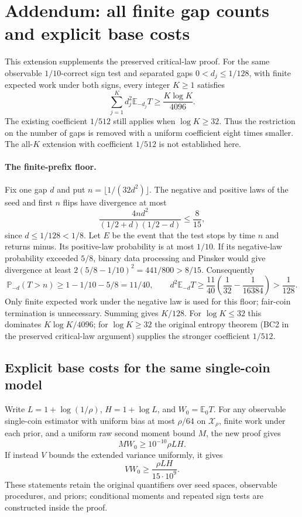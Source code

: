\documentclass[11pt]{article}
\newcommand{\E}{\mathbb E}
\newcommand{\Pp}{\mathbb P}
\begin{document}
\endgroup
\clearpage
\section*{Addendum: all finite gap counts and explicit base costs}
{}

This extension supplements the preserved critical-law proof. For the same
observable $1/10$-correct sign test and separated gaps $0<d_j\le1/128$,
with finite expected work under both signs, every integer $K\ge1$ satisfies
\[
 \sum_{j=1}^K d_j^2\E_{-d_j}T\ge\frac{K\log K}{4096}.
\]
The existing coefficient $1/512$ still applies when $\log K\ge32$.
Thus the restriction on the number of gaps is removed with a uniform
coefficient eight times smaller. The all-$K$ extension with coefficient
$1/512$ is not established here.

\paragraph{The finite-prefix floor.}
Fix one gap $d$ and put $n=\lfloor1/(32d^2)\rfloor$. The negative and
positive laws of the seed and first $n$ flips have divergence at most
\[
 \frac{4nd^2}{(1/2+d)(1/2-d)}\le\frac8{15},
\]
since $d\le1/128<1/8$. Let $E$ be the event that the test stops by time
$n$ and returns minus. Its positive-law probability is at most $1/10$.
If its negative-law probability exceeded $5/8$, binary data processing
and Pinsker would give divergence at least
$2(5/8-1/10)^2=441/800>8/15$. Consequently
\[
 \Pp_{-d}(T>n)\ge1-1/10-5/8=11/40,
 \qquad
 d^2\E_{-d}T\ge\frac{11}{40}\left(\frac1{32}-\frac1{16384}\right)
 >\frac1{128}.
\]
Only finite expected work under the negative law is used for this floor;
fair-coin termination is unnecessary. Summing gives $K/128$. For
$\log K\le32$ this dominates $K\log K/4096$; for $\log K\ge32$ the
original entropy theorem (BC2 in the preserved critical-law argument)
supplies the stronger coefficient $1/512$.

\subsection*{Explicit base costs for the same single-coin model}
{}
Write $L=1+\log(1/\rho)$, $H=1+\log L$, and $W_0=\E_0T$.
For any observable single-coin estimator with uniform bias at most
$\rho/64$ on $\mathcal X_\rho$, finite work under each prior, and a
uniform raw second moment bound $M$, the new proof gives
\[
 M W_0\ge 10^{-10}\rho LH.
\]
If instead $V$ bounds the extended variance uniformly, it gives
\[
 V W_0\ge\frac{\rho LH}{15\cdot10^9}.
\]
These statements retain the original quantifiers over seed spaces,
observable procedures, and priors; conditional moments and repeated
sign tests are constructed inside the proof.
\end{document}
